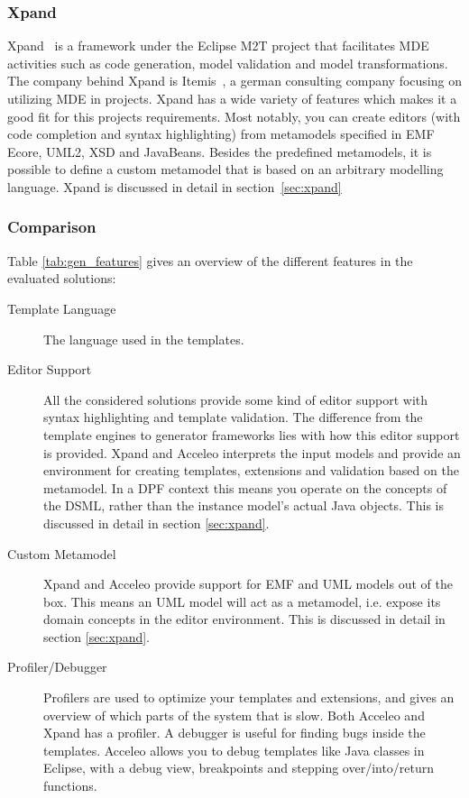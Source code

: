 \subsubsection{Xpand}
Xpand~\cite{xpand} is a framework under the Eclipse M2T project that facilitates MDE activities such as code generation, model validation and model transformations. The company behind Xpand is Itemis~\cite{itemis}, a german consulting company focusing on utilizing MDE in projects. Xpand has a wide variety of features which makes it a good fit for this projects requirements. Most notably, you can create editors (with code completion and syntax highlighting) from metamodels specified in EMF Ecore, UML2, XSD and JavaBeans. Besides the predefined metamodels, it is possible to define a custom metamodel that is based on an arbitrary modelling language. Xpand is discussed in detail in section~\ref{sec:xpand}\newline

\subsubsection{Comparison}
Table \ref{tab:gen_features} gives an overview of the different features in the evaluated solutions: 
\begin{description}
  \item[Template Language] The language used in the templates.
  \item[Editor Support] All the considered solutions provide some kind of editor support with syntax highlighting and template validation. The difference from the template engines to generator frameworks lies with how this editor support is provided. Xpand and Acceleo interprets the input models and provide an environment for creating templates, extensions and validation based on the metamodel. In a DPF context this means you operate on the concepts of the DSML, rather than the instance model's actual Java objects. This is discussed in detail in section \ref{sec:xpand}.
  \item[Custom Metamodel] Xpand and Acceleo provide support for EMF and UML models out of the box. This means an UML model will act as a metamodel, i.e. expose its domain concepts in the editor environment. This is discussed in detail in section \ref{sec:xpand}.
  \item[Profiler/Debugger] Profilers are used to optimize your templates and extensions, and gives an overview of which parts of the system that is slow. Both Acceleo and Xpand has a profiler.
  A debugger is useful for finding bugs inside the templates. Acceleo allows you to debug templates like Java classes in Eclipse, with a debug view, breakpoints and stepping over/into/return functions.
\end{description}
\let\Oldarraystretch\arraystretch
\renewcommand*\arraystretch{1.5}

